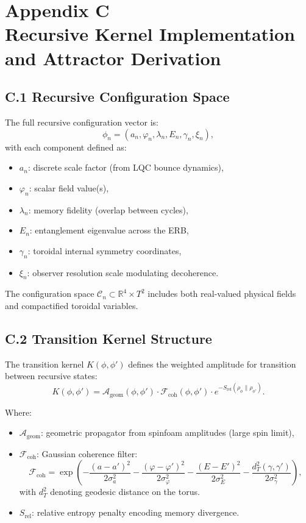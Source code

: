 \section*{Appendix C\\Recursive Kernel Implementation and Attractor Derivation}
\label{appendix:C}

\subsection*{C.1 Recursive Configuration Space}

The full recursive configuration vector is:
\[
\phi_n = (a_n, \varphi_n, \lambda_n, E_n, \gamma_n, \xi_n),
\]
with each component defined as:

\begin{itemize}[leftmargin=1.5em]
  \item \( a_n \): discrete scale factor (from LQC bounce dynamics),
  \item \( \varphi_n \): scalar field value(s),
  \item \( \lambda_n \): memory fidelity (overlap between cycles),
  \item \( E_n \): entanglement eigenvalue across the ERB,
  \item \( \gamma_n \): toroidal internal symmetry coordinates,
  \item \( \xi_n \): observer resolution scale modulating decoherence.
\end{itemize}

The configuration space \( \mathcal{C}_n \subset \mathbb{R}^4 \times T^2 \) includes both real-valued physical fields and compactified toroidal variables.

\subsection*{C.2 Transition Kernel Structure}

The transition kernel \( K(\phi, \phi') \) defines the weighted amplitude for transition between recursive states:
\[
K(\phi, \phi') = \mathcal{A}_{\text{geom}}(\phi, \phi') \cdot \mathcal{F}_{\text{coh}}(\phi, \phi') \cdot e^{-S_{\text{rel}}(\rho_\phi \| \rho_{\phi'})}.
\]

Where:

\begin{itemize}[leftmargin=1.5em]
  \item \( \mathcal{A}_{\text{geom}} \): geometric propagator from spinfoam amplitudes (large spin limit),
  \item \( \mathcal{F}_{\text{coh}} \): Gaussian coherence filter:
  \[
  \mathcal{F}_{\text{coh}} = \exp\left( 
    -\frac{(a - a')^2}{2\sigma_a^2}
    -\frac{(\varphi - \varphi')^2}{2\sigma_\varphi^2}
    -\frac{(E - E')^2}{2\sigma_E^2}
    -\frac{d_T^2(\gamma, \gamma')}{2\sigma_\gamma^2}
  \right),
  \]
  with \( d_T^2 \) denoting geodesic distance on the torus.

  \item \( S_{\text{rel}} \): relative entropy penalty encoding memory divergence.
\end{itemize}

